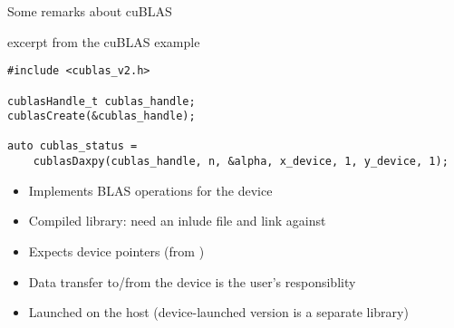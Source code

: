 \documentclass[aspectratio=43]{beamer}
\begin{document}
\begin{frame}[fragile]{Some remarks about cuBLAS}

    \begin{code}{excerpt from the cuBLAS example}
        \begin{lstlisting}[style=boxcudatiny]
#include <cublas_v2.h>

cublasHandle_t cublas_handle;
cublasCreate(&cublas_handle);

auto cublas_status =
    cublasDaxpy(cublas_handle, n, &alpha, x_device, 1, y_device, 1);

        \end{lstlisting}
    \end{code}

    \begin{itemize}
        \item Implements BLAS operations for the device
        \item Compiled library: need an inlude file and link against 
        \item Expects device pointers (from )
        \item Data transfer to/from the device is the user's responsiblity
        \item Launched on the host (device-launched version is a separate library)
    \end{itemize}

\end{frame}
\end{document}
